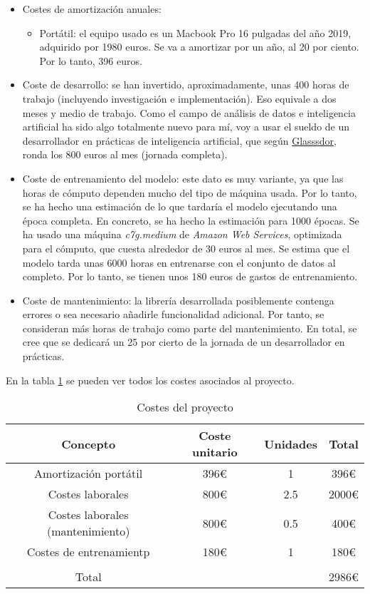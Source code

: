 \begin{itemize}
  \item Costes de amortización anuales:
  \begin{itemize}
    \item Portátil: el equipo usado es un Macbook Pro 16 pulgadas del año 2019, adquirido por 1980 euros. Se va a amortizar por un año, al 20 por ciento. Por lo tanto, 396 euros.
  \end{itemize}
  \item Coste de desarrollo: se han invertido, aproximadamente, unas 400 horas de trabajo (incluyendo investigación e implementación). Eso equivale a
  dos meses y medio de trabajo. Como el campo de análisis de datos e inteligencia artificial ha sido algo totalmente nuevo para mí, voy a usar el sueldo
  de un desarrollador en prácticas de inteligencia artificial, que según \href{https://www.glassdoor.com/}{Glasssdor}, ronda los 800 euros al mes (jornada completa).
  \item Coste de entrenamiento del modelo: este dato es muy variante, ya que las horas de cómputo dependen mucho del tipo de máquina usada. Por lo tanto, se ha hecho una estimación
  de lo que tardaría el modelo ejecutando una época completa. En concreto, se ha hecho la estimación para 1000 épocas. Se ha usado una máquina \textit{c7g.medium} de \textit{Amazon Web Services},
  optimizada para el cómputo, que cuesta alrededor de 30 euros al mes. Se estima que el modelo tarda unas 6000 horas en entrenarse con el conjunto de datos al completo. Por lo tanto, se tienen unos
  180 euros de gastos de entrenamiento.
  \item Coste de mantenimiento: la librería desarrollada posiblemente contenga errores o sea necesario añadirle funcionalidad adicional. Por tanto, se consideran más horas de trabajo como parte del mantenimiento.
  En total, se cree que se dedicará un 25 por cierto de la jornada de un desarrollador en prácticas.
\end{itemize}

En la tabla \ref{costes} se pueden ver todos los costes asociados al proyecto.

\begin{table}
  \centering
  \begin{tabular}{ cccc }
    \hline
    Concepto & Coste unitario & Unidades & Total \\
    \hline
    Amortización portátil & 396\euro{} & 1 & 396\euro{} \\
    Costes laborales & 800\euro{} & 2.5 & 2000\euro{}\\
    Costes laborales (mantenimiento) & 800\euro{} & 0.5 & 400\euro{}\\
    Costes de entrenamientp & 180\euro{} & 1 & 180\euro{} \\
    \hline
     &  &  & \\
     Total &  &  & 2986\euro{}
  \end{tabular}
  \caption{Costes del proyecto}
  \label{costes}
\end{table}